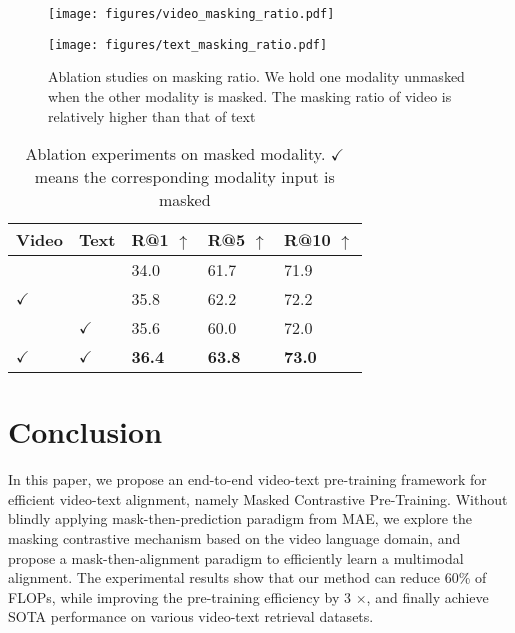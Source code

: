 \documentclass[10pt,twocolumn,letterpaper]{article}
\begin{document}
\begin{figure}[htbp]
\centering
\setlength{\abovecaptionskip}{0.cm}
\begin{minipage}[t]{0.48\textwidth}
\centering
\texttt{[image: figures/video\_masking\_ratio.pdf]}
\end{minipage}
\begin{minipage}[t]{0.48\textwidth}
\centering
\texttt{[image: figures/text\_masking\_ratio.pdf]}
 \caption{Ablation studies on masking ratio. We hold one modality unmasked when the other modality is masked. The masking ratio of video is relatively higher than that of text} 
\label{fig:masking ratio}\vspace{-1mm}

\end{minipage}
\end{figure}





\begin{table}[h]
    \centering
    \small
    \begin{tabular}{@{}ll|lll@{}}
    \toprule
    \textbf{Video}  &  \textbf{Text}   &  \textbf{R@1} $\uparrow$  & \textbf{R@5} $\uparrow$   & \textbf{R@10}  $\uparrow$   \\ \midrule
                  &                  &  34.0      & 61.7      & 71.9    \\
    $\checkmark$  &                  & 35.8       & 62.2      & 72.2    \\ 
                  & $\checkmark$     & 35.6       & 60.0      & 72.0         \\  
    $\checkmark$  &  $\checkmark$    & \textbf{36.4}       &  \textbf{63.8}     & \textbf{73.0}         \\ \bottomrule 
    \end{tabular}
    \caption{Ablation experiments on masked modality. $\checkmark$ means the corresponding modality input is masked}
    \label{tab:modality-ablations}\vspace{-1mm}
    \end{table}
    




\vspace{-1mm}\section{Conclusion}\vspace{-1mm}
In this paper, we propose an end-to-end video-text pre-training framework for efficient video-text alignment, namely Masked Contrastive Pre-Training. Without blindly applying mask-then-prediction paradigm from MAE, we explore the masking contrastive mechanism based on the video language domain, and propose a mask-then-alignment paradigm  to efficiently learn a multimodal alignment. The experimental results show that our method can reduce 60\% of FLOPs, while improving the pre-training efficiency by 3 $\times$, and finally achieve SOTA performance on various video-text retrieval datasets.

{\small


}
\end{document}
